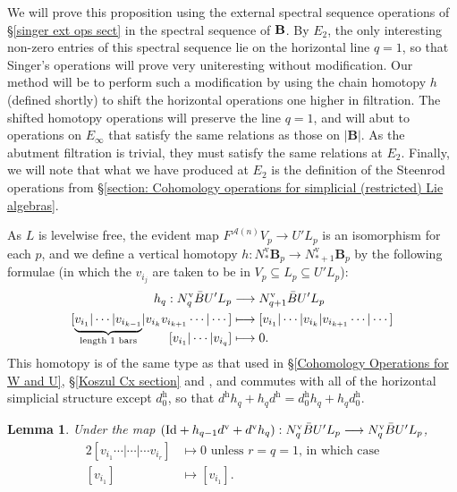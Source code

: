 \documentclass[11pt]{amsart} \renewcommand{\baselinestretch}{1.2}
\theoremstyle{plain}
\newtheorem{lem}[thm]{Lemma}
\theoremstyle{definition}
\renewcommand{\to}{\longrightarrow}
\newcommand{\calA}{\mathcal{A}}
\newcommand{\UEA}{U'}%
\newcommand{\uver}{^\mathrm{v}}
\newcommand{\uhor}{^\mathrm{h}}
\newcommand{\diag}[1]{|#1|}
\begin{document}
\begin{appendices}
We will prove this proposition using the external spectral sequence operations of \S\ref{singer ext ops sect} in the spectral sequence of $\textup{\textbf{B}}$. By $E_2$, the only interesting non-zero entries of this spectral sequence lie on the horizontal line $q=1$, so that Singer's operations will prove very uniteresting without modification. Our method will be to perform such a modification by using the  chain homotopy $h$ (defined shortly) to shift the horizontal operations one higher in filtration. The shifted homotopy operations will preserve the line $q=1$, and will abut to operations on $E_\infty$ that satisfy the same relations as those on $\diag{\textbf{B}}$. As the abutment filtration is trivial, they must satisfy the same relations at $E_2$. Finally, we will note that what we have produced at $E_2$ is the definition of the Steenrod operations from \S\ref{section: Cohomology operations for simplicial (restricted) Lie algebras}.


As $ L$ is levelwise free, the evident map $F^{\calA(n)}V_p\to \UEA L_p$ is an isomorphism for each $p$, and we define a vertical homotopy $h:N\uver_*\textbf{B}_{p}\to N\uver_{*+1}\textbf{B}_{p}$ by the following formulae (in which the $v_{i_{j}}$ are taken to be in $V_p\subseteq  L_p\subseteq\UEA L_p$):
\begin{alignat*}{2}
h_q:N\uver_q\bar{B}\UEA L_p&\overset{}{\longrightarrow} N\uver_{q+1}\bar{B}\UEA L_p\\
[\smash{\underbrace{v_{i_1}|\cdots |v_{i_{k-1}}}_{\textup{length 1 bars}}}|v_{i_{k}}v_{i_{k+1}}\cdots |\cdots ]
&\overset{}{\longmapsto}
[v_{i_1}|\cdots |v_{i_{k}}|v_{i_{k+1}}\cdots |\cdots ]%
\\
[v_{i_1}|\cdots |v_{i_{q}}]
&\overset{}{\longmapsto}0.
\end{alignat*}
This homotopy is of the same type as that used in \S\ref{Cohomology Operations for W and U}, \S\ref{Koszul Cx section} and \cite[Proof of Theorem 5.3]{PriddyKoszul.pdf}, and commutes with all of the horizontal simplicial structure except $d\uhor_0$, so that $d\uhor h_q+h_qd\uhor =d\uhor_0h_q+h_qd\uhor_0$.
\begin{lem}
\label{barConstNullHtpyLemma}
Under the map $(\textup{Id}+h_{q-1}d\uver+d\uver h_{q}): N\uver_q\bar{B}\UEA L_p\to N\uver_q\bar{B}\UEA L_p$,
\begin{alignat*}{2}
[v_{i_1}\cdots |\cdots |\cdots v_{i_r}]
&\longmapsto0\text{ unless $r=q=1$, in which case}%
\\
[v_{i_1}]
&\longmapsto [v_{i_{1}}].
\end{alignat*}
\end{lem}


\end{appendices}
\end{document}
